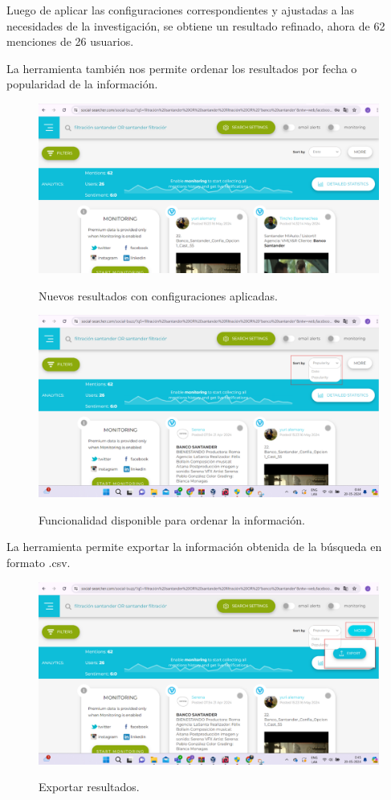 \documentclass[stu, 11pt, letterpaper, donotrepeattitle, floatsintext, natbib]{apa7}
\begin{document}
Luego de aplicar las configuraciones correspondientes y ajustadas a las necesidades de la investigación, se obtiene un resultado refinado, ahora de 62 menciones de 26 usuarios. 

La herramienta también nos permite ordenar los resultados por fecha o popularidad de la información. 

\begin{figure}[H]
\centering
\caption{Nuevos resultados con configuraciones aplicadas.}
\includegraphics[width=0.75\linewidth]{osi13.png} %
\label{fig:OverallEffect}
\end{figure}

\begin{figure}[H]
\centering
\caption{Funcionalidad disponible para ordenar la información.}
\includegraphics[width=0.75\linewidth]{osi14.png} %
\label{fig:OverallEffect}
\end{figure}

La herramienta permite exportar la información obtenida de la búsqueda en formato .csv.

\begin{figure}[H]
\centering
\caption{Exportar resultados.}
\includegraphics[width=0.75\linewidth]{osi15.png} %
\label{fig:OverallEffect}
\end{figure}
\end{document}
